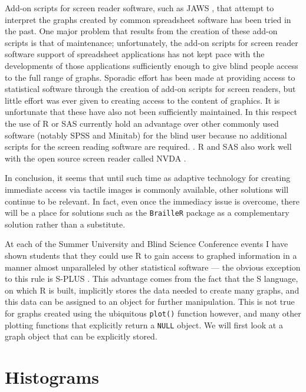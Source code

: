 \documentclass[
]{book}
\begin{document}
Add-on scripts for screen reader software, such as JAWS \citep{JAWS}, that attempt to interpret the graphs created by common spreadsheet software has been tried in the past.
One major problem that results from the creation of these add-on scripts is that of maintenance; unfortunately, the add-on scripts for screen reader software support of spreadsheet applications has not kept pace with the developments of those applications sufficiently enough to give blind people access to the full range of graphs. Sporadic effort has been made at providing access to statistical software through the creation of add-on scripts for screen readers, but little effort was ever given to creating access to the content of graphics. It is unfortunate that these have also not been sufficiently maintained. In this respect the use of R or SAS currently hold an advantage over other commonly used software (notably SPSS and Minitab) for the blind user because no additional scripts for the screen reading software are required. \citep{GodfreyLoots2014JSS}. R and SAS also work well with the open source screen reader called NVDA \citep{NVDA}.

In conclusion, it seems that until such time as adaptive technology for creating immediate access via tactile images is commonly available, other solutions will continue to be relevant. In fact, even once the immediacy issue is overcome, there will be a place for solutions such as the \texttt{BrailleR} package as a complementary solution rather than a substitute.

At each of the Summer University and Blind Science Conference events I have shown students that they could use R to gain access to graphed information in a manner almost unparalleled by other statistical software --- the obvious exception to this rule is S-PLUS \citep{SPLUS-Soft}.
This advantage comes from the fact that the S language, on which R is built, implicitly stores the data needed to create many graphs, and this data can be assigned to an object for further manipulation.
This is not true for graphs created using the ubiquitous \texttt{plot()} function however, and many other plotting functions that explicitly return a \texttt{NULL} object. We will first look at a graph object that can be explicitly stored.

\hypertarget{histograms}{%
\section{Histograms}\label{histograms}}
\end{document}
